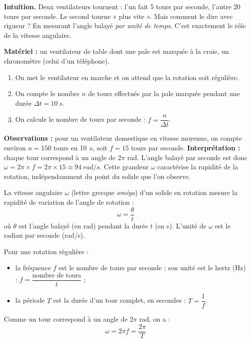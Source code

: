 \documentclass[11pt]{article}
\newcommand{\cle}[1]{{\popxbold\color{popdark}#1}}
\newcounter{popsec}
\newcounter{popsub}
\newcommand{\courssub}[1]{%
  \stepcounter{popsub}%
  \par\vspace{9pt}\noindent{\popxbold\fontsize{11.5}{13}\selectfont\color{popink}{\color{poporange}\thepopsec.\thepopsub}\hspace{6pt}#1}\par\nopagebreak\vspace{4pt}
}
\begin{document}
\courssub{La vitesse angulaire $\omega$}

\textbf{Intuition.} Deux ventilateurs tournent : l'un fait 5 tours par seconde, l'autre 20 tours par seconde. Le second tourne « plus vite ». Mais comment le dire avec rigueur ? En mesurant l'angle balayé \emph{par unité de temps}. C'est exactement le rôle de la vitesse angulaire.

\begin{experience}
\textbf{Matériel :} un ventilateur de table dont une pale est marquée à la craie, un chronomètre (celui d'un téléphone).
\begin{enumerate}
\item On met le ventilateur en marche et on attend que la rotation soit régulière.
\item On compte le nombre $n$ de tours effectués par la pale marquée pendant une durée $\Delta t = \SI{10}{s}$.
\item On calcule le nombre de tours par seconde : $f = \dfrac{n}{\Delta t}$.
\end{enumerate}
\textbf{Observations :} pour un ventilateur domestique en vitesse moyenne, on compte environ $n = 150$ tours en \SI{10}{s}, soit $f = 15$ tours par seconde.
\textbf{Interprétation :} chaque tour correspond à un angle de $2\pi$ rad. L'angle balayé par seconde est donc $\omega = 2\pi \times f = 2\pi \times 15 \approx \SI{94}{rad/s}$. Cette grandeur $\omega$ caractérise la rapidité de la rotation, indépendamment du point du solide que l'on observe.
\end{experience}

\begin{definition}
La \cle{vitesse angulaire} $\omega$ (lettre grecque \emph{oméga}) d'un solide en rotation mesure la rapidité de variation de l'angle de rotation :
\[ \omega = \dfrac{\theta}{t} \]
où $\theta$ est l'angle balayé (en rad) pendant la durée $t$ (en s). L'unité de $\omega$ est le \cle{radian par seconde} (rad/s).
\end{definition}

\begin{propriete}
Pour une rotation régulière :
\begin{itemize}
\item la \cle{fréquence} $f$ est le nombre de tours par seconde ; son unité est le \cle{hertz} (Hz) : $f = \dfrac{\text{nombre de tours}}{t}$ ;
\item la \cle{période} $T$ est la durée d'un tour complet, en secondes : $T = \dfrac{1}{f}$.
\end{itemize}
Comme un tour correspond à un angle de $2\pi$ rad, on a :
\[ \omega = 2\pi f = \dfrac{2\pi}{T} \]
\end{propriete}
\end{document}
